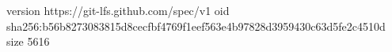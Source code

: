 version https://git-lfs.github.com/spec/v1
oid sha256:b56b8273083815d8cecfbf4769f1eef563e4b97828d3959430c63d5fe2c4510d
size 5616

